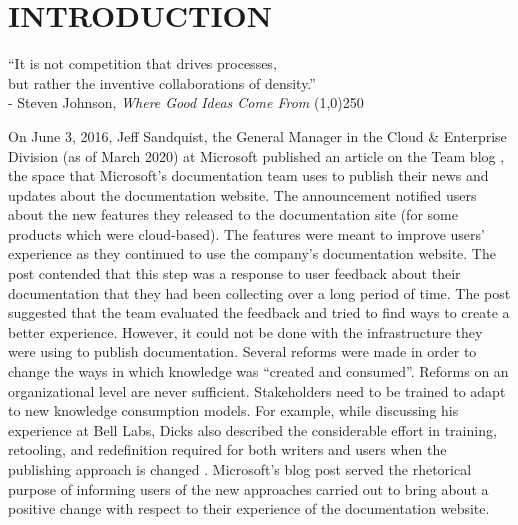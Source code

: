 \chapter{INTRODUCTION}
\label{chap-one}

\begin{flushright}

  ``It is not competition that drives processes,
  \\but rather the inventive collaborations of density.''
  \\- Steven Johnson, \textit{Where Good Ideas Come From}
  \line(1,0){250}
\end{flushright}

On June 3, 2016, Jeff Sandquist, the General Manager in the Cloud \& Enterprise Division (as of March 2020) at Microsoft published an article on the Team blog \cite{sandquist}, the space that Microsoft’s documentation team uses to publish their news and updates about the documentation website. The announcement notified users about the new features they released to the documentation site (for some products which were cloud-based). The features were meant to improve users' experience as they continued to use the company’s documentation website. The post contended that this step was a response to user feedback about their documentation that they had been collecting over a long period of time. The post suggested that the team evaluated the feedback and tried to find ways to create a better experience. However, it could not be done with the infrastructure they were using to publish documentation. Several reforms were made in order to change the ways in which knowledge was “created and consumed”. Reforms on an organizational level are never sufficient. Stakeholders need to be trained to adapt to new knowledge consumption models. For example, while discussing his experience at Bell Labs, Dicks also described the considerable effort in training, retooling, and redefinition required for both writers and users when the publishing approach is changed \cite{dicks1994integrating}. Microsoft’s blog post served the rhetorical purpose of informing users of the new approaches carried out to bring about a positive change with respect to their experience of the documentation website.

